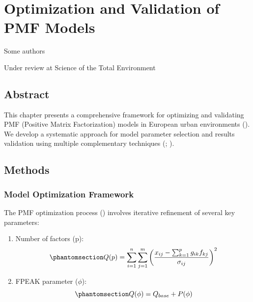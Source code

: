 \documentclass[
  letterpaper,
  oneside,
  openany]{MastersDoctoralThesis}
\begin{document}

\chapter{Optimization and Validation of PMF Models}\label{sec-ch2}

\begin{center}
Some authors

\end{center}

Under review at Science of the Total Environment

\section{Abstract}\label{abstract}

This chapter presents a comprehensive framework for optimizing and
validating PMF (Positive Matrix Factorization) models in European urban
environments (). We
develop a systematic approach for model parameter selection and results
validation using multiple complementary techniques
(;
).

\section{Methods}\label{methods}

\subsection{Model Optimization
Framework}\label{model-optimization-framework}

The PMF optimization process ()
involves iterative refinement of several key parameters:

\begin{enumerate}
\def\labelenumi{\arabic{enumi}.}
\item
  Number of factors (p):
  \begin{equation}\phantomsection\label{eq-pmf-opt}{Q(p) = \sum_{i=1}^{n} \sum_{j=1}^{m} \left(\frac{x_{ij} - \sum_{k=1}^{p} g_{ik}f_{kj}}{\sigma_{ij}}\right)^2}\end{equation}
\item
  FPEAK parameter (\(\phi\)):
  \begin{equation}\phantomsection\label{eq-pmf-fpeak}{Q(\phi) = Q_{base} + P(\phi)}\end{equation}
\end{enumerate}
\end{document}
